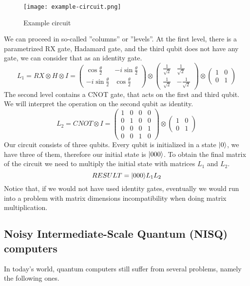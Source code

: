 \begin{figure}[H]
    \begin{center}
       \texttt{[image: example-circuit.png]}
       \caption{Example circuit}
    \end{center}
\end{figure}

We can proceed in so-called ''columns'' or ''levels''.
At the first level, there is a parametrized RX gate, Hadamard gate, and the third qubit does not have any gate, we can consider that as an identity gate.
$$L_1 = RX \otimes H \otimes I = \begin{pmatrix} 
\cos{\frac{\theta}{2}} & -i\sin{\frac{\theta}{2}} \\
-i\sin{\frac{\theta}{2}} & \cos{\frac{\theta}{2}}
\end{pmatrix} \otimes \begin{pmatrix} 
\frac{1}{\sqrt{2}} &  \frac{1}{\sqrt{2}}  \\
\frac{1}{\sqrt{2}}  &  -\frac{1}{\sqrt{2}} 
\end{pmatrix} \otimes \begin{pmatrix} 
1 & 0 \\
0 & 1
\end{pmatrix}$$
The second level contains a CNOT gate, that acts on the first and third qubit. We will interpret the operation on the second qubit as identity. 
$$ L_2 = CNOT \otimes I = \begin{pmatrix}
1 & 0 & 0 & 0 \\
0 & 1 & 0 & 0 \\
0 & 0 & 0 & 1 \\
0 & 0 & 1 & 0
\end{pmatrix}\otimes\begin{pmatrix} 
1 & 0 \\
0 & 1
\end{pmatrix}$$
Our circuit consists of three qubits. Every qubit is initialized in a state $\lvert0\rangle$, we have three of them, therefore our initial state is $\lvert000\rangle$. To obtain the final matrix of the circuit we need to multiply the initial state with matrices $L_1$ and $L_2$.
$$RESULT = \lvert000\rangle L_{1}L_2$$
Notice that, if we would not have used identity gates, eventually we would run into a problem with matrix dimensions incompatibility when doing matrix multiplication.

\subsection{Noisy Intermediate-Scale Quantum (NISQ) computers}
In today's world, quantum computers still suffer from several problems, namely the following ones.

